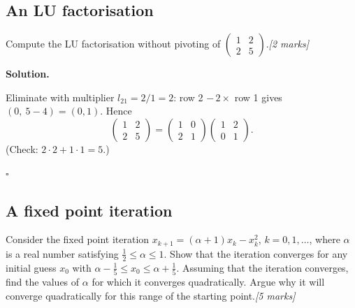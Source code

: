\documentclass[11pt,a4paper]{article}
\newenvironment{solution}
  {\par\noindent\textbf{Solution.}\par\nobreak}
  {\par\hfill\(\square\)\par}
\newcommand{\mk}[1]{\hfill\textit{[#1 marks]}}
\begin{document}
\subsection{An LU factorisation}

\begin{qbox}
Compute the LU factorisation without pivoting of
\(\begin{pmatrix}1&2\\2&5\end{pmatrix}\).\mk{2}
\end{qbox}

\begin{solution}
Eliminate with multiplier \(l_{21}=2/1=2\): row 2 \(-\,2\times\) row 1
gives \((0,\ 5-4)=(0,1)\).  Hence
\[
  \begin{pmatrix}1&2\\2&5\end{pmatrix}
  =\begin{pmatrix}1&0\\2&1\end{pmatrix}
   \begin{pmatrix}1&2\\0&1\end{pmatrix}.
\]
(Check: \(2\cdot2+1\cdot1=5\).)
\end{solution}

\subsection{A fixed point iteration}

\begin{qbox}
Consider the fixed point iteration \(x_{k+1}=(\alpha+1)x_k-x_k^2\),
\(k=0,1,\dots\), where \(\alpha\) is a real number satisfying
\(\frac12\le\alpha\le1\).  Show that the iteration converges for any
initial guess \(x_0\) with \(\alpha-\frac15\le x_0\le\alpha+\frac15\).
Assuming that the iteration converges, find the values of \(\alpha\) for
which it converges quadratically.  Argue why it will converge
quadratically for this range of the starting point.\mk{5}
\end{qbox}
\end{document}

